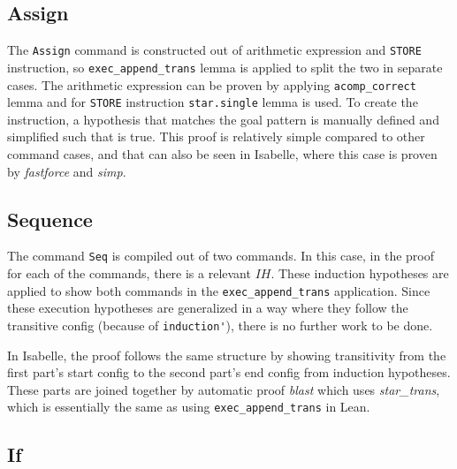 \subsection{Assign}
The \lstinline{Assign} command is constructed out of arithmetic expression and \lstinline{STORE} instruction, so  \lstinline{exec_append_trans} lemma is applied to split the two in separate cases. The arithmetic expression can be proven by applying \lstinline{acomp_correct} lemma and for \lstinline{STORE} instruction \lstinline{star.single} lemma is used. To create the instruction, a hypothesis that matches the goal pattern is manually defined and simplified such that is true. This proof is relatively simple compared to other command cases, and that can also be seen in Isabelle, where this case is proven by \emph{fastforce} and \emph{simp}.

\subsection{Sequence}
The command \lstinline{Seq} is compiled out of two commands. In this case, in the proof for each of the commands, there is a relevant $IH$. These induction hypotheses are applied to show both commands in the \lstinline{exec_append_trans} application. Since these execution hypotheses are generalized in a way where they follow the transitive config (because of \lstinline{induction'}), there is no further work to be done.

In Isabelle, the proof follows the same structure by showing transitivity from the first part's start config to the second part's end config from induction hypotheses. These parts are joined together by automatic proof \emph{blast} which uses \emph{star\_trans}, which is essentially the same as using \lstinline{exec_append_trans} in Lean. 

\subsection{If}

